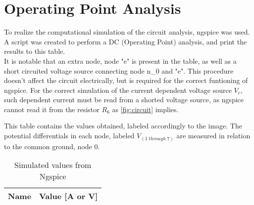 \section{Operating Point Analysis}
\label{sec:simulation}

To realize the computational simulation of the circuit analysis, ngspice was used. A script was created to perform a DC (Operating Point) analysis, and print the results to this table.\\
It is notable that an extra node, node "e" is present in the table, as well as a short circuited voltage source connecting node n\_0 and "e". This procedure doesn't affect the circuit electrically, but is required for the correct funtioning of ngspice. For the correct simulation of the current dependent voltage source $V_{c}$, such dependent current must be read from a shorted voltage source, as ngspice cannot read it from the resistor $R_{6}$ as \ref{fig:circuit} implies.

This table contains the values obtained, labeled accordingly to the image. The potential differentials in each node, labeled $V_{(1 \; through \; 7)}$ are measured in relation to the common ground, node 0. 

\begin{table}[h]
  \centering
  \begin{tabular}{|l|r|}
    \hline    
    {\bf Name} & {\bf Value [A or V]} \\ \hline
    
  \end{tabular}
  \caption{Simulated values from Ngspice}
  \label{tab:op}
\end{table}



